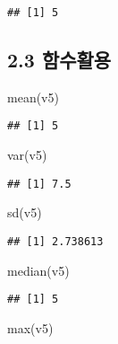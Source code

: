 \documentclass[
]{article}
\newenvironment{Shaded}{\begin{snugshade}}{\end{snugshade}}
\newcommand{\FunctionTok}[1]{\textcolor[rgb]{0.00,0.00,0.00}{#1}}
\newcommand{\NormalTok}[1]{#1}
\begin{document}
\begin{verbatim}
## [1] 5
\end{verbatim}

\hypertarget{uxd568uxc218uxd65cuxc6a9}{%
\subsection{2.3 함수활용}\label{uxd568uxc218uxd65cuxc6a9}}

\begin{Shaded}
\begin{Highlighting}[]
\FunctionTok{mean}\NormalTok{(v5)}
\end{Highlighting}
\end{Shaded}

\begin{verbatim}
## [1] 5
\end{verbatim}

\begin{Shaded}
\begin{Highlighting}[]
\FunctionTok{var}\NormalTok{(v5)}
\end{Highlighting}
\end{Shaded}

\begin{verbatim}
## [1] 7.5
\end{verbatim}

\begin{Shaded}
\begin{Highlighting}[]
\FunctionTok{sd}\NormalTok{(v5)}
\end{Highlighting}
\end{Shaded}

\begin{verbatim}
## [1] 2.738613
\end{verbatim}

\begin{Shaded}
\begin{Highlighting}[]
\FunctionTok{median}\NormalTok{(v5)}
\end{Highlighting}
\end{Shaded}

\begin{verbatim}
## [1] 5
\end{verbatim}

\begin{Shaded}
\begin{Highlighting}[]
\FunctionTok{max}\NormalTok{(v5)}
\end{Highlighting}
\end{Shaded}
\end{document}
